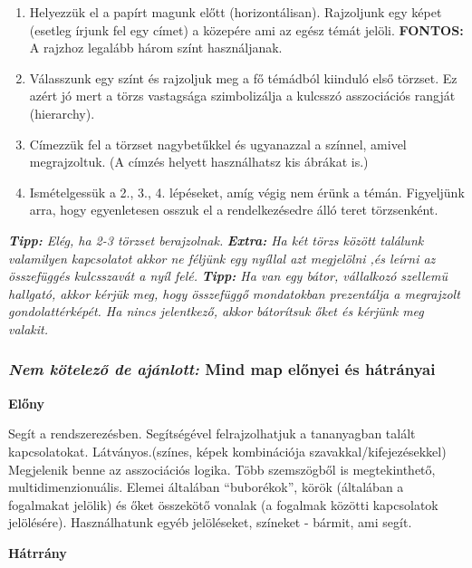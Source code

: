 \documentclass[../Main.tex]{subfiles}
\begin{document}
\begin{enumerate}
    \item Helyezzük el a papírt magunk előtt (horizontálisan).
    Rajzoljunk egy képet (esetleg írjunk fel egy címet) a közepére ami az egész témát jelöli.
    \textbf{FONTOS:} A rajzhoz legalább három színt használjanak.

    \item Válasszunk egy színt és rajzoljuk meg a fő témádból kiinduló első törzset.
    Ez azért jó mert a törzs vastagsága szimbolizálja a kulcsszó asszociációs rangját (hierarchy).

    \item Címezzük fel a törzset nagybetűkkel és ugyanazzal a színnel, amivel megrajzoltuk.
    (A címzés helyett használhatsz kis ábrákat is.)

    \item Ismételgessük a 2., 3., 4. lépéseket, amíg végig nem érünk a témán. Figyeljünk arra, hogy egyenletesen osszuk el a rendelkezésedre álló teret törzsenként.
   
\end{enumerate}
\textit{\textbf{Tipp:} Elég, ha 2-3 törzset berajzolnak.} \newline
\textit{\textbf{Extra:} Ha két törzs között találunk valamilyen kapcsolatot akkor ne
féljünk egy nyíllal azt megjelölni ,és leírni az összefüggés kulcsszavát a nyíl felé.} \newline
\textit{\textbf{Tipp:} Ha van egy bátor, vállalkozó szellemü hallgató, akkor kérjük meg,
hogy összefüggő mondatokban prezentálja a megrajzolt gondolattérképét. Ha nincs jelentkező,
akkor bátorítsuk őket és kérjünk meg valakit.}

\subsubsection{\textit{Nem kötelező de ajánlott:} Mind map előnyei és hátrányai}

\textbf{Előny}

Segít a rendszerezésben.
Segítségével felrajzolhatjuk a tananyagban talált kapcsolatokat.
Látványos.(színes, képek kombinációja szavakkal/kifejezésekkel)
Megjelenik benne az asszociációs logika.
Több szemszögből is megtekinthető, multidimenzionuális.
Elemei általában “buborékok”, körök (általában a fogalmakat jelölik) és őket összekötő vonalak 
(a fogalmak közötti kapcsolatok jelölésére).
Használhatunk egyéb jelöléseket, színeket - bármit, ami segít.

\textbf{Hátrrány}
\end{document}
